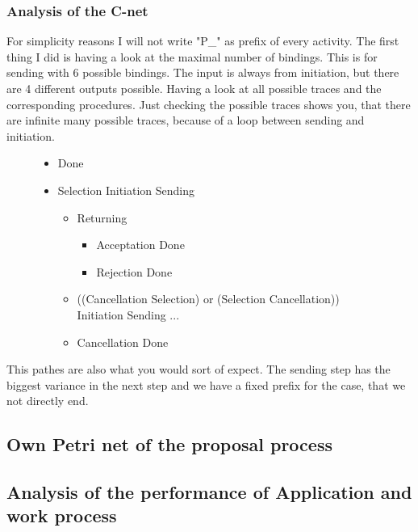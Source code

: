 \subsubsection{Analysis of the C-net}
For simplicity reasons I will not write "P\_" as prefix of every activity.
The first thing I did is having a look at the maximal number of bindings. This is for sending with 6 possible bindings. The input is always from initiation, but there are 4 different outputs possible. Having a look at all possible traces and the corresponding procedures.  Just checking the possible traces shows you, that there are infinite many possible traces, because of a loop between sending and initiation. 
\begin{figure}[!htbp]
\begin{itemize}
	\item Done
	\item Selection \textrightarrow Initiation \textrightarrow Sending \textrightarrow
	\begin{itemize}
	\item  Returning \textrightarrow
	\begin{itemize}
		\item Acceptation \textrightarrow Done
		\item Rejection \textrightarrow Done
	\end{itemize}
	\item ((Cancellation \textrightarrow Selection) or (Selection \textrightarrow Cancellation)) \textrightarrow Initiation \textrightarrow Sending ...
	\item Cancellation \textrightarrow Done
	\end{itemize}
\end{itemize}
\end{figure}

This pathes are also what you would sort of expect. The sending step has the biggest variance in the next step and we have a fixed prefix for the case, that we not directly end.


\subsection{Own Petri net of the proposal process}

\subsection{Analysis of the performance of Application and work process}
